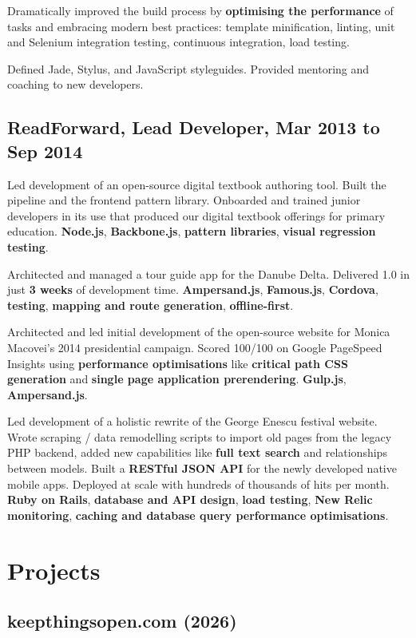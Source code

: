 \documentclass{article}
\begin{document}
Dramatically improved the build process by \textbf{optimising the performance}
of tasks and embracing modern best practices: template minification, linting,
unit and Selenium integration testing, continuous integration, load testing.

Defined Jade, Stylus, and JavaScript styleguides. Provided mentoring and
coaching to new developers.

\subsection*{ReadForward, Lead Developer, Mar 2013 to Sep 2014}

Led development of an open-source digital textbook authoring tool. Built the
pipeline and the frontend pattern library. Onboarded and trained junior
developers in its use that produced our digital textbook offerings for primary
education. \textbf{Node.js}, \textbf{Backbone.js}, \textbf{pattern libraries},
\textbf{visual regression testing}.

Architected and managed a tour guide app for the Danube Delta. Delivered 1.0 in
just \textbf{3 weeks} of development time. \textbf{Ampersand.js},
\textbf{Famous.js}, \textbf{Cordova}, \textbf{testing}, \textbf{mapping and
route generation}, \textbf{offline-first}.

Architected and led initial development of the open-source website for Monica
Macovei's 2014 presidential campaign. Scored 100/100 on Google PageSpeed
Insights using \textbf{performance optimisations} like \textbf{critical path CSS
generation} and \textbf{single page application prerendering}. \textbf{Gulp.js},
\textbf{Ampersand.js}.

Led development of a holistic rewrite of the George Enescu festival website.
Wrote scraping / data remodelling scripts to import old pages from the legacy
PHP backend, added new capabilities like \textbf{full text search} and
relationships between models. Built a \textbf{RESTful JSON API} for the newly
developed native mobile apps. Deployed at scale with hundreds of thousands of
hits per month. \textbf{Ruby on Rails}, \textbf{database and API design},
\textbf{load testing}, \textbf{New Relic monitoring}, \textbf{caching and
database query performance optimisations}.

\section*{Projects}

\subsection*{keepthingsopen.com (2026)}
\end{document}
